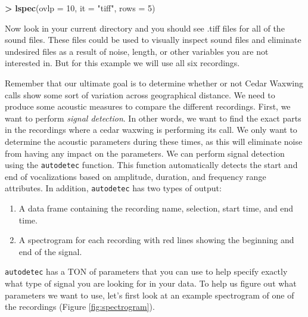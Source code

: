 \documentclass[
]{krantz}
\makeatletter
\newenvironment{Shaded}{\begin{snugshade}}{\end{snugshade}}
\newcommand{\DataTypeTok}[1]{\textcolor[rgb]{0.27,0.27,0.27}{#1}}
\newcommand{\DecValTok}[1]{\textcolor[rgb]{0.06,0.06,0.06}{#1}}
\newcommand{\KeywordTok}[1]{\textcolor[rgb]{0.27,0.27,0.27}{\textbf{#1}}}
\newcommand{\NormalTok}[1]{#1}
\newcommand{\OperatorTok}[1]{\textcolor[rgb]{0.43,0.43,0.43}{\textbf{#1}}}
\newcommand{\StringTok}[1]{\textcolor[rgb]{0.5,0.5,0.5}{#1}}
\providecommand{\tightlist}{%
  \setlength{\itemsep}{0pt}\setlength{\parskip}{0pt}}
\newenvironment{kframe}{%
\medskip{}
\setlength{\fboxsep}{.8em}
 \def\at@end@of@kframe{}%
 \ifinner\ifhmode%
  \def\at@end@of@kframe{\end{minipage}}%
  \begin{minipage}{\columnwidth}%
 \fi\fi%
 \def\FrameCommand##1{\hskip\@totalleftmargin \hskip-\fboxsep
 \colorbox{shadecolor}{##1}\hskip-\fboxsep
     \hskip-\linewidth \hskip-\@totalleftmargin \hskip\columnwidth}%
 \MakeFramed {\advance\hsize-\width
   \@totalleftmargin\z@ \linewidth\hsize
   \@setminipage}}%
 {\par\unskip\endMakeFramed%
 \at@end@of@kframe}
\renewenvironment{Shaded}{\begin{kframe}}{\end{kframe}}
\makeatother
\begin{document}
\begin{Shaded}
\begin{Highlighting}[]
\OperatorTok{\textgreater{}}\StringTok{ }\KeywordTok{lspec}\NormalTok{(}\DataTypeTok{ovlp =} \DecValTok{10}\NormalTok{, }\DataTypeTok{it =} \StringTok{"tiff"}\NormalTok{, }\DataTypeTok{rows =} \DecValTok{5}\NormalTok{)}
\end{Highlighting}
\end{Shaded}

Now look in your current directory and you should see .tiff files for all of the sound files. These files could be used to visually inspect sound files and eliminate undesired files as a result of noise, length, or other variables you are not interested in. But for this example we will use all six recordings.

Remember that our ultimate goal is to determine whether or not Cedar Waxwing calls show some sort of variation across geographical distance. We need to produce some acoustic measures to compare the different recordings. First, we want to perform \emph{signal detection}. In other words, we want to find the exact parts in the recordings where a cedar waxwing is performing its call. We only want to determine the acoustic parameters during these times, as this will eliminate noise from having any impact on the parameters. We can perform signal detection using the \texttt{autodetec} function. This function automatically detects the start and end of vocalizations based on amplitude, duration, and frequency range attributes. In addition, \texttt{autodetec} has two types of output:

\begin{enumerate}
\def\labelenumi{\arabic{enumi}.}
\tightlist
\item
  A data frame containing the recording name, selection, start time, and end time.
\item
  A spectrogram for each recording with red lines showing the beginning and end of the signal.
\end{enumerate}

\texttt{autodetec} has a TON of parameters that you can use to help specify exactly what type of signal you are looking for in your data. To help us figure out what parameters we want to use, let's first look at an example spectrogram of one of the recordings (Figure \ref{fig:spectrogram}).
\end{document}
